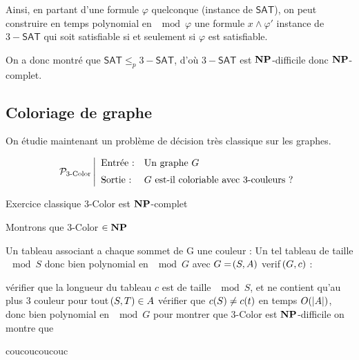 \documentclass[a4paper,french,bookmarks]{book}
\newcommand{\cNP}{\bbN\bbP}
\newcommand{\SAT}{\textsf{SAT}}
\begin{document}
    Ainsi, en partant d'une formule $\varphi$ quelconque (instance de $\SAT$), on peut construire en temps polynomial en $\mod{\varphi}$ une formule $x \land \varphi'$ instance de $3-\SAT$ qui soit satisfiable si et seulement si $\varphi$ est satisfiable.
    
    On a donc montré que $\SAT \leq_p 3-\SAT$, d'où $3-\SAT$ est $\cNP$-difficile donc $\cNP$-complet.
        
    \subsection{Coloriage de graphe}
            
        On étudie maintenant un problème de décision très classique sur les graphes.
            
        \[ \mathcal{P}_\text{3-Color} \left\vert\begin{array}{ll}
            \text{Entrée :} & \text{Un graphe $G$}  \\[0.2cm]
            \text{Sortie :} & \text{$G$ est-il coloriable avec 3-couleurs ?}
        \end{array}\right.\]
            
        \begin{theorem}{Exercice classique}{}
            3-Color est $\cNP$-complet
        \end{theorem}
        \begin{nproof}
            Montrons que 3-Color $\in \cNP$
            \begin{enumerate}
                \itt Un tableau associant a chaque sommet de G une couleur : Un tel tableau de taille $\mod S$ donc bien polynomial en $\mod G$ avec $G = \!\left(S, A\right)$
                \itt verif $\!\left(G, c\right)$ :
                \begin{enumerate}
                    \itt vérifier que la longueur du tableau $c$ est de taille $\mod S$, et ne contient qu'au plus 3 couleur
                    \itt pour tout $\!\left(S, T\right) \in A$ vérifier que $c\!\left(S\right) \neq c\!\left(t\right)$ en temps $O\!\left(\left\lvert A\right\rvert\right)$, donc bien polynomial en $\mod G$
                    \itt pour montrer que 3-Color est $\cNP$-difficile on montre que 
                \end{enumerate}
            \end{enumerate}
        \end{nproof}
        
        
        
        \begin{form}
            coucoucoucouc
        \end{form}
        
\end{document}
